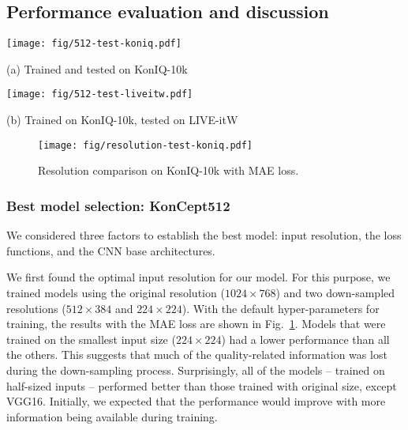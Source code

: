 \documentclass[10pt,journal,compsoc]{IEEEtran}
\begin{document}
\subsection{Performance evaluation and discussion}



\begin{figure*}[!ht]
\centering
\begin{minipage}{0.4\linewidth}
\centerline{\texttt{[image: fig/512-test-koniq.pdf]}}
\centerline{(a) Trained and tested on KonIQ-10k}
\end{minipage}
\begin{minipage}{0.4\linewidth}
\centerline{\texttt{[image: fig/512-test-liveitw.pdf]}}
\centerline{(b) Trained on KonIQ-10k, tested on LIVE-itW}
\end{minipage}
\caption{Loss function and base architecture comparison at $512\times384$ px, trained on KonIQ-10k training set, tested on (a) KonIQ-10k test set and (b) entire LIVE-itW.}
\label{fig:512-test}
\vspace{-15pt}
\end{figure*}

\begin{figure}[!t]
\centering
\vspace{-5pt}
\texttt{[image: fig/resolution-test-koniq.pdf]}
\caption{Resolution comparison on KonIQ-10k with MAE loss.}
\label{fig:resolution-test-koniq}
\vspace{-0pt}
\end{figure}

\subsubsection{Best model selection: KonCept512}
We considered three factors to establish the best model: input resolution, the loss functions, and the CNN base architectures.

We first found the optimal input resolution for our model. For this purpose, we trained models using the original resolution ($1024 \times 768$) and two down-sampled resolutions ($512 \times 384$ and $224 \times 224$). With the default hyper-parameters for training, the results with the MAE loss are shown in Fig.~\ref{fig:resolution-test-koniq}.
Models that were trained on the smallest input size ($224 \times 224$)  had a lower performance than all the others. This suggests that much of the quality-related information was lost during the down-sampling process. Surprisingly, all of the models -- trained on half-sized inputs -- performed better than those trained with original size, except VGG16. Initially, we expected that the performance would improve with more information being available during training. 
\end{document}
